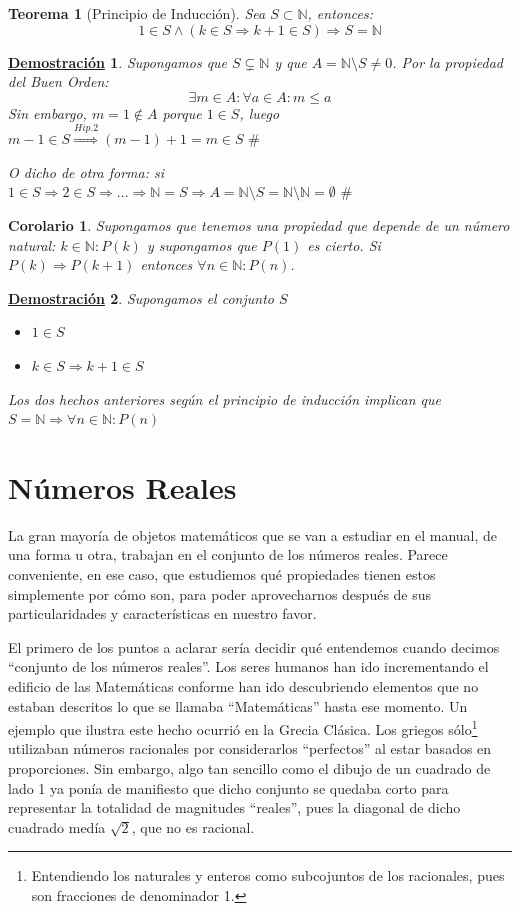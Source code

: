 \documentclass[10pt,a4paper,openright]{book}
\theoremstyle{break}
\newtheorem{theo}{Teorema}[chapter]
\newtheorem{coro}{Corolario}[theo]
\newtheorem*{demo}{\underline{Demostración}}
\begin{document}
\begin{theo}[Principio de Inducción]
Sea $S\subset \mathbb N$, entonces:
$$1\in S\wedge (k\in S\Rightarrow k+1\in S)\Rightarrow S=\mathbb N$$
\end{theo}
\begin{demo}
Supongamos que $S\subsetneq \mathbb N$ y que $A=\mathbb N\mbox{\textbackslash} S\neq 0$. Por la propiedad del Buen Orden:
$$\exists m \in A : \forall a \in A: m\leq a$$
Sin embargo, $m=1\notin A$ porque $1\in S$, luego $m-1\in S\stackrel{Hip. 2}{\Rightarrow} (m-1)+1=m\in S \mbox{ \#}$\par
O dicho de otra forma: si $1\in S\Rightarrow 2\in S \Rightarrow ... \Rightarrow \mathbb N=S\Rightarrow A=\mathbb N \mbox{\textbackslash} S=\mathbb N \mbox{\textbackslash} \mathbb N=\emptyset \mbox{ \#}$
\end{demo}

\begin{coro}
Supongamos que tenemos una propiedad que depende de un número natural: $k \in \mathbb N : P(k)$ y supongamos que $P(1)$ es cierto. Si $P(k)\Rightarrow P(k+1)$ entonces $\forall n \in \mathbb N : P(n)$.
\end{coro}
\begin{demo}
Supongamos el conjunto $S$
\begin{itemize}
\item $1\in S$
\item $k\in S\Rightarrow k+1\in S$
\end{itemize}
Los dos hechos anteriores según el principio de inducción implican que $S=\mathbb N\Rightarrow \forall n \in \mathbb N : P(n)$
\end{demo}

\chapter{Números Reales}
\label{chap: numeros reales}
La gran mayoría de objetos matemáticos que se van a estudiar en el manual, de una forma u otra, trabajan en el conjunto de los números reales. Parece conveniente, en ese caso, que estudiemos qué propiedades tienen estos simplemente por cómo son, para poder aprovecharnos después de sus particularidades y características en nuestro favor.

El primero de los puntos a aclarar sería decidir qué entendemos cuando decimos ``conjunto de los números reales''. Los seres humanos han ido incrementando el edificio de las Matemáticas conforme han ido descubriendo elementos que no estaban descritos lo que se llamaba ``Matemáticas'' hasta ese momento. Un ejemplo que ilustra este hecho ocurrió en la Grecia Clásica. Los griegos sólo\footnote{Entendiendo los naturales y enteros como subcojuntos de los racionales, pues son fracciones de denominador 1.} utilizaban números racionales por considerarlos ``perfectos'' al estar basados en proporciones. Sin embargo, algo tan sencillo como el dibujo de un cuadrado de lado 1 ya ponía de manifiesto que dicho conjunto se quedaba corto para representar la totalidad de magnitudes ``reales'', pues la diagonal de dicho cuadrado medía $\sqrt{2}$, que no es racional.
\end{document}
